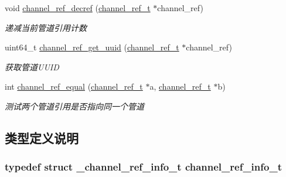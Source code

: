 \begin{DoxyCompactItemize}
void \hyperlink{a00041_a039d289fc9cc8550fece0cd7b154ca7c_a039d289fc9cc8550fece0cd7b154ca7c}{channel\+\_\+ref\+\_\+decref} (\hyperlink{a00044_a151271c9d188ef28d4d24bb81dcc1263_a151271c9d188ef28d4d24bb81dcc1263}{channel\+\_\+ref\+\_\+t} $\ast$channel\+\_\+ref)
\begin{DoxyCompactList}\small\item\em 递减当前管道引用计数 \end{DoxyCompactList}\item 
uint64\+\_\+t \hyperlink{a00084_ga3fd39b821fef38abd518db6240e79068_ga3fd39b821fef38abd518db6240e79068}{channel\+\_\+ref\+\_\+get\+\_\+uuid} (\hyperlink{a00044_a151271c9d188ef28d4d24bb81dcc1263_a151271c9d188ef28d4d24bb81dcc1263}{channel\+\_\+ref\+\_\+t} $\ast$channel\+\_\+ref)
\begin{DoxyCompactList}\small\item\em 获取管道\+U\+U\+I\+D \end{DoxyCompactList}\item 
int \hyperlink{a00084_gad44fcb68845cb3ebb582a9de6db9abd0_gad44fcb68845cb3ebb582a9de6db9abd0}{channel\+\_\+ref\+\_\+equal} (\hyperlink{a00044_a151271c9d188ef28d4d24bb81dcc1263_a151271c9d188ef28d4d24bb81dcc1263}{channel\+\_\+ref\+\_\+t} $\ast$a, \hyperlink{a00044_a151271c9d188ef28d4d24bb81dcc1263_a151271c9d188ef28d4d24bb81dcc1263}{channel\+\_\+ref\+\_\+t} $\ast$b)
\begin{DoxyCompactList}\small\item\em 测试两个管道引用是否指向同一个管道 \end{DoxyCompactList}\end{DoxyCompactItemize}


\subsection{类型定义说明}
\hypertarget{a00041_a3c8048d6abb647710be83f9b243c7822_a3c8048d6abb647710be83f9b243c7822}{}
\subsubsection[{channel\+\_\+ref\+\_\+info\+\_\+t}]{\setlength{\rightskip}{0pt plus 5cm}typedef struct {\bf \+\_\+channel\+\_\+ref\+\_\+info\+\_\+t}  {\bf channel\+\_\+ref\+\_\+info\+\_\+t}}\label{a00041_a3c8048d6abb647710be83f9b243c7822_a3c8048d6abb647710be83f9b243c7822}


